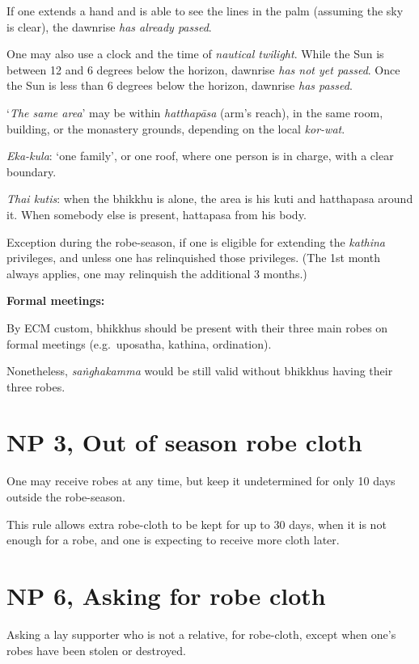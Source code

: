 If one extends a hand and is able to see the lines in the palm (assuming
the sky is clear), the dawnrise \emph{has already passed}.

One may also use a clock and the time of \emph{nautical twilight}. While
the Sun is between 12 and 6 degrees below the horizon, dawnrise
\emph{has not yet passed}. Once the Sun is less than 6 degrees below the
horizon, dawnrise \emph{has passed}.

`\emph{The same area}' may be within \emph{hatthapāsa} (arm's reach), in
the same room, building, or the monastery grounds, depending on the
local \emph{kor-wat}.

\emph{Eka-kula}: `one family', or one roof, where one person is in
charge, with a clear boundary.

\emph{Thai kutis}: when the bhikkhu is alone, the area is his kuti and
hatthapasa around it. When somebody else is present, hattapasa from his
body.

Exception during the robe-season, if one is eligible for extending the
\emph{kathina} privileges, and unless one has relinquished those
privileges. (The 1st month always applies, one may relinquish the
additional 3 months.)

\textbf{Formal meetings:}

By ECM custom, bhikkhus should be present with their three main robes on
formal meetings (e.g.~uposatha, kathina, ordination).

Nonetheless, \emph{saṅghakamma} would be still valid without bhikkhus
having their three robes.

\section{NP 3, Out of season robe cloth}

One may receive robes at any time, but keep it undetermined for only 10
days outside the robe-season.

This rule allows extra robe-cloth to be kept for up to 30 days, when it
is not enough for a robe, and one is expecting to receive more cloth
later.

\section{NP 6, Asking for robe cloth}

Asking a lay supporter who is not a relative, for robe-cloth, except
when one's robes have been stolen or destroyed.

